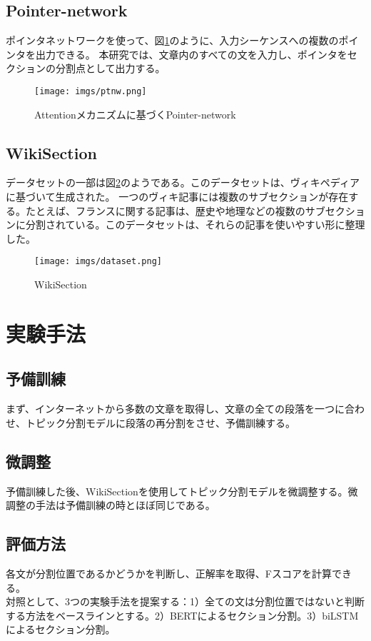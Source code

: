 \documentclass[a4paper]{article}
\begin{document}
\subsection{Pointer-network}

ポインタネットワークを使って、図\ref{fig:img2}のように、入力シーケンスへの複数のポインタを出力できる。 本研究では、文章内のすべての文を入力し、ポインタをセクションの分割点として出力する。

\begin{figure}[H]
  \texttt{[image: imgs/ptnw.png]}
  \caption{Attentionメカニズムに基づくPointer-network}
  \label{fig:img2}
\end{figure}

\subsection{WikiSection}

データセットの一部は図\ref{fig:img3}のようである。このデータセットは、ヴィキペディアに基づいて生成された。 一つのヴィキ記事には複数のサブセクションが存在する。たとえば、フランスに関する記事は、歴史や地理などの複数のサブセクションに分割されている。このデータセットは、それらの記事を使いやすい形に整理した。

\begin{figure}
  \texttt{[image: imgs/dataset.png]}
  \caption{WikiSection}
  \label{fig:img3}
\end{figure}

\section{実験手法}

\subsection{予備訓練}

まず、インターネットから多数の文章を取得し、文章の全ての段落を一つに合わせ、トピック分割モデルに段落の再分割をさせ、予備訓練する。

\subsection{微調整}

予備訓練した後、WikiSectionを使用してトピック分割モデルを微調整する。微調整の手法は予備訓練の時とほぼ同じである。

\subsection{評価方法}

各文が分割位置であるかどうかを判断し、正解率を取得、Fスコアを計算できる。\\

対照として、3つの実験手法を提案する：1）全ての文は分割位置ではないと判断する方法をベースラインとする。2）BERTによるセクション分割。3）biLSTMによるセクション分割。

\printbibliography
\end{document}
